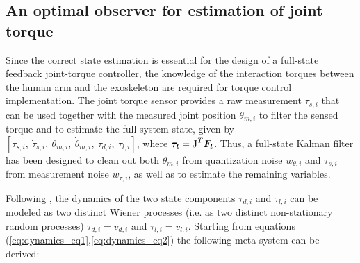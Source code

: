 \documentclass[journal]{IEEEtran}
\newcommand{\vectm}[1]{ { {\text #1} }}
\newcommand{\vects}[1]{{\boldsymbol {#1}}}
\begin{document}
\subsection{An optimal observer for estimation of joint torque}\label{subsec:kalmanTorque}
Since the correct state estimation  is essential for the design of a full-state feedback joint-torque controller, the knowledge of the interaction torques between the human arm and the exoskeleton are required for  torque control implementation. The joint torque sensor provides a raw measurement $\tau_{s,i}$ that can be used together with the measured joint position $\theta_{m,i}$ to filter the sensed torque and to estimate the full system state, given by $[\tau_{s,i},\ \dot{\tau}_{s,i},\ \theta_{m,i},\ \dot{\theta}_{m,i},\ \tau_{d,i},\ \tau_{l,i}]$, where $\vects{\tau_l}=\vectm{J}^T \vects{F_l}$. 
Thus, a full-state Kalman filter has been designed to clean out both  $\theta_{m,i}$ from quantization noise $w_{\theta,i}$ and $\tau_{s,i}$ from measurement noise $w_{\tau,i}$, as well as to estimate the remaining variables.
%
\par 
Following \cite{vertechy2012interaction}, the dynamics of the two state components $\tau_{d,i}$ and $\tau_{l,i}$ can be modeled as two distinct Wiener processes (i.e. as two distinct non-stationary random processes) $\dot{\tau}_{d,i}=v_{d,i}$ and $\dot{\tau}_{l,i}=v_{l,i}$. Starting from equations (\ref{eq:dynamics_eq1},\ref{eq:dynamics_eq2}) the following meta-system can be derived:
%


\end{document}
